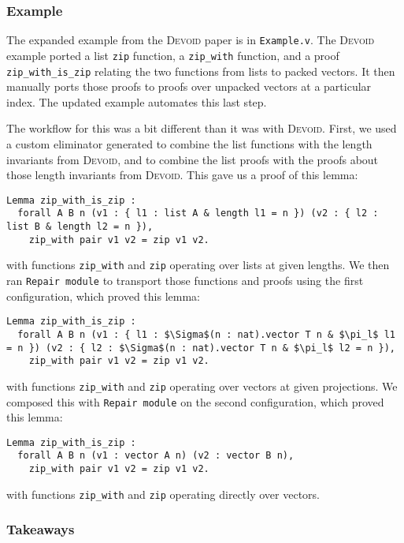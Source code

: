 \subsubsection{Example}

The expanded example from the \textsc{Devoid} paper is in \lstinline{Example.v}.
The \textsc{Devoid} example ported a list \lstinline{zip} function,
a \lstinline{zip_with} function, and a proof \lstinline{zip_with_is_zip} relating the two
functions from lists to packed vectors.
It then manually ports those proofs to proofs over unpacked vectors at a particular index.
The updated \toolname example automates this last step.

The workflow for this was a bit different than it was with \textsc{Devoid}.
First, we used a custom eliminator \toolname generated to combine the list functions
with the length invariants from \textsc{Devoid}, and to combine the list proofs
with the proofs about those length invariants from \textsc{Devoid}.
This gave us a proof of this lemma:

\begin{lstlisting}
Lemma zip_with_is_zip :
  forall A B n (v1 : { l1 : list A & length l1 = n }) (v2 : { l2 : list B & length l2 = n }),
    zip_with pair v1 v2 = zip v1 v2.
\end{lstlisting}
with functions \lstinline{zip_with} and \lstinline{zip} operating over lists at given lengths.
We then ran \lstinline{Repair module} to transport those functions and proofs using the first
configuration, which proved this lemma:

\begin{lstlisting}
Lemma zip_with_is_zip :
  forall A B n (v1 : { l1 : $\Sigma$(n : nat).vector T n & $\pi_l$ l1 = n }) (v2 : { l2 : $\Sigma$(n : nat).vector T n & $\pi_l$ l2 = n }),
    zip_with pair v1 v2 = zip v1 v2.
\end{lstlisting}
with functions \lstinline{zip_with} and \lstinline{zip} operating over vectors at given projections.
We composed this with \lstinline{Repair module} on the second configuration,
which proved this lemma:

\begin{lstlisting}
Lemma zip_with_is_zip :
  forall A B n (v1 : vector A n) (v2 : vector B n),
    zip_with pair v1 v2 = zip v1 v2.
\end{lstlisting}
with functions \lstinline{zip_with} and \lstinline{zip} operating directly over vectors.

\subsubsection{Takeaways}


